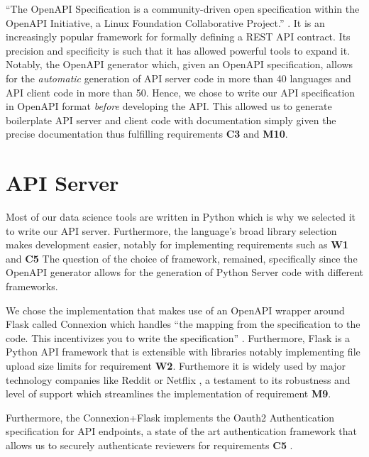 \documentclass[\version]{l4proj}
\begin{document}
``The OpenAPI Specification is a community-driven open specification within the OpenAPI Initiative, a Linux Foundation Collaborative Project.'' \autocite{OAIOpenAPISpecification2020}.
It is an increasingly popular framework for formally defining a REST API contract.
Its precision and specificity is such that it has allowed powerful tools to expand it.
Notably, the OpenAPI generator \autocite{OpenAPIToolsOpenapigenerator2020} which, given an OpenAPI specification, allows for the \textit{automatic} generation of API server code in more than 40 languages and API client code in more than 50.
Hence, we chose to write our API specification in OpenAPI format \textit{before} developing the API.
This allowed us to generate boilerplate API server and client code with documentation simply given the precise documentation thus fulfilling requirements \textbf{C3} and \textbf{M10}.

\section{API Server}

Most of our data science tools are written in Python which is why we selected it to write our API server.
Furthermore, the language's broad library selection makes development easier, notably for implementing requirements such as \textbf{W1} and \textbf{C5}
The question of the choice of framework, remained, specifically since the OpenAPI generator allows for the generation of Python Server code with different frameworks.

We chose the implementation that makes use of an OpenAPI wrapper around Flask called Connexion which handles ``the mapping from the specification to the code.
This incentivizes you to write the specification'' \autocite{ZalandoConnexion2020}.
Furthermore, Flask is a Python API framework that is extensible with libraries notably implementing file upload size limits for requirement \textbf{W2}. Furthemore it is widely used by major technology companies like Reddit or Netflix \autocite{WhyDevelopersFlask}, a testament to its robustness and level of support which streamlines the implementation of requirement \textbf{M9}.

Furthermore, the Connexion+Flask implements the Oauth2 Authentication specification for API endpoints, a state of the art authentication framework that allows us to securely authenticate reviewers for requirements \textbf{C5} \autocite{jonesOAuthAuthorizationFramework2012}.
\end{document}

